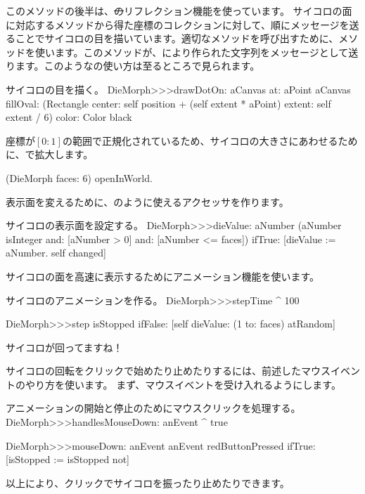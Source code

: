 \documentclass[a4paper,10pt,twoside]{book}
\begin{document}
このメソッドの後半は、\st のリフレクション機能を使っています。
サイコロの面に対応するメソッドから得た座標のコレクションに対して、順にメッセージを送ることでサイコロの目を描いています。適切なメソッドを呼び出すために、メソッドを使います。このメソッドが、により作られた文字列をメッセージとして送ります。このようなの使い方は至るところで見られます。
\begin{method}{サイコロの目を描く。}
DieMorph>>>drawDotOn: aCanvas at: aPoint
	aCanvas
		fillOval: (Rectangle
			center: self position + (self extent * aPoint)
			extent: self extent / 6)
		color: Color black
\end{method}

座標が$[0{:}1]$の範囲で正規化されているため、サイコロの大きさにあわせるために、で拡大します。

\begin{code}{}
(DieMorph faces: 6) openInWorld.
\end{code}

表示面を変えるために、のように使えるアクセッサを作ります。
\begin{method}{サイコロの表示面を設定する。}
DieMorph>>>dieValue: aNumber
	(aNumber isInteger
			and: [aNumber > 0]
			and: [aNumber <= faces])
		ifTrue:
			[dieValue := aNumber.
			self changed]
\end{method}

サイコロの面を高速に表示するためにアニメーション機能を使います。
\begin{methods}{サイコロのアニメーションを作る。}
DieMorph>>>stepTime
	^ 100

DieMorph>>>step
	isStopped ifFalse: [self dieValue: (1 to: faces) atRandom]
\end{methods}
サイコロが回ってますね！

サイコロの回転をクリックで始めたり止めたりするには、前述したマウスイベントのやり方を使います。
まず、マウスイベントを受け入れるようにします。

\begin{methods}{アニメーションの開始と停止のためにマウスクリックを処理する。}
DieMorph>>>handlesMouseDown: anEvent
	^ true

DieMorph>>>mouseDown: anEvent
	anEvent redButtonPressed
		ifTrue: [isStopped := isStopped not]
\end{methods}
以上により、クリックでサイコロを振ったり止めたりできます。
\end{document}
